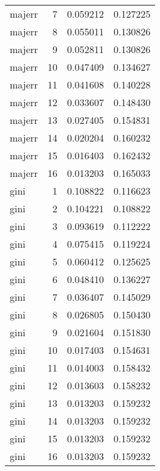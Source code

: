 \begin{longtable}{lrrr}
  majerr &          7 &     0.059212 &    0.127225 \\
  majerr &          8 &     0.055011 &    0.130826 \\
  majerr &          9 &     0.052811 &    0.130826 \\
  majerr &         10 &     0.047409 &    0.134627 \\
  majerr &         11 &     0.041608 &    0.140228 \\
  majerr &         12 &     0.033607 &    0.148430 \\
  majerr &         13 &     0.027405 &    0.154831 \\
  majerr &         14 &     0.020204 &    0.160232 \\
  majerr &         15 &     0.016403 &    0.162432 \\
  majerr &         16 &     0.013203 &    0.165033 \\
    gini &          1 &     0.108822 &    0.116623 \\
    gini &          2 &     0.104221 &    0.108822 \\
    gini &          3 &     0.093619 &    0.112222 \\
    gini &          4 &     0.075415 &    0.119224 \\
    gini &          5 &     0.060412 &    0.125625 \\
    gini &          6 &     0.048410 &    0.136227 \\
    gini &          7 &     0.036407 &    0.145029 \\
    gini &          8 &     0.026805 &    0.150430 \\
    gini &          9 &     0.021604 &    0.151830 \\
    gini &         10 &     0.017403 &    0.154631 \\
    gini &         11 &     0.014003 &    0.158432 \\
    gini &         12 &     0.013603 &    0.158232 \\
    gini &         13 &     0.013203 &    0.159232 \\
    gini &         14 &     0.013203 &    0.159232 \\
    gini &         15 &     0.013203 &    0.159232 \\
    gini &         16 &     0.013203 &    0.159232 \\
\end{longtable}
